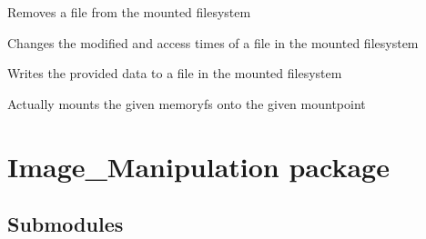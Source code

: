 \documentclass[letterpaper,12pt,openany,oneside]{sphinxmanual}
\begin{document}
\begin{fulllineitems}

\begin{fulllineitems}
\label{File_System:webStegFS.File_System.memfuse.MemFS.unlink}
Removes a file from the mounted filesystem

\end{fulllineitems}


\begin{fulllineitems}
\label{File_System:webStegFS.File_System.memfuse.MemFS.utimens}
Changes the modified and access times of a file in the mounted filesystem

\end{fulllineitems}


\begin{fulllineitems}
\label{File_System:webStegFS.File_System.memfuse.MemFS.write}
Writes the provided data to a file in the mounted filesystem

\end{fulllineitems}


\end{fulllineitems}


\begin{fulllineitems}
\label{File_System:webStegFS.File_System.memfuse.mount}
Actually mounts the given memoryfs onto the given mountpoint

\end{fulllineitems}



\section{Image\_Manipulation package}
\label{Image_Manipulation::doc}\label{Image_Manipulation:image-manipulation-package}

\subsection{Submodules}
\label{Image_Manipulation:submodules}
\end{document}

